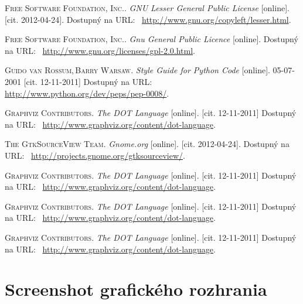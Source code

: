 \documentclass[11pt,oneside,final]{fithesis2}
\begin{document}
\begin{thebibliography}{99}
    \textsc{Free Software Foundation, Inc.}.
    \textit{GNU Lesser General Public License} [online].
    [cit. \mbox{2012-04-24}].
    Dostupný na URL:~
    \url{http://www.gnu.org/copyleft/lesser.html}.   

    \textsc{Free Software Foundation, Inc.}.
    \textit{Gnu General Public Licence} [online].
    Dostupný na URL:~
    \url{http://www.gnu.org/licenses/gpl-2.0.html}.   

    \textsc{Guido van Rossum,\,Barry Warsaw}.
    \textit{Style Guide for Python Code} [online].
    05-07-2001
    [cit. 12-11-2011]
    Dostupný na URL:~
    \url{http://www.python.org/dev/peps/pep-0008/}. 
        
    \textsc{Graphviz Contributors}.
    \textit{The DOT Language} [online].
    [cit. 12-11-2011]
    Dostupný na URL:~
    \url{http://www.graphviz.org/content/dot-language}.    
        
    \textsc{The GtkSourceView Team}.
    \textit{Gnome.org} [online].
    [cit. \mbox{2012-04-24}].
    Dostupný na URL:~
    \url{http://projects.gnome.org/gtksourceview/}.    
        
    \textsc{Graphviz Contributors}.
    \textit{The DOT Language} [online].
    [cit. 12-11-2011]
    Dostupný na URL:~
    \url{http://www.graphviz.org/content/dot-language}.    
        
    \textsc{Graphviz Contributors}.
    \textit{The DOT Language} [online].
    [cit. 12-11-2011]
    Dostupný na URL:~
    \url{http://www.graphviz.org/content/dot-language}.    
    
    \textsc{Graphviz Contributors}.
    \textit{The DOT Language} [online].
    [cit. 12-11-2011]
    Dostupný na URL:~
    \url{http://www.graphviz.org/content/dot-language}.  

\end{thebibliography}

\appendix
\chapter{Screenshot grafického rozhrania}
\end{document}
